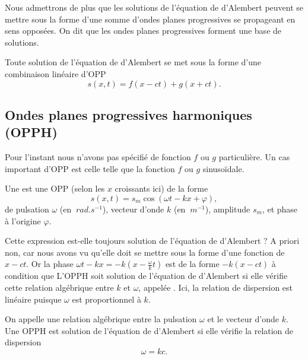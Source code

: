 \documentclass[12pt,fancy]{cours}
\begin{document}
Nous admettrons de plus que  les solutions de l'équation de d'Alembert peuvent se mettre sous la forme d’une somme d’ondes planes progressives se propageant en sens opposées. On dit que les ondes planes progressives forment une base de solutions.

\begin{prop}\label{prop:}
  Toute solution de l’équation de d’Alembert se met sous la forme d'une combinaison linéaire d'OPP
  $$
  s(x,t)=f(x-ct)+g(x+ct).
  $$
\end{prop}


\subsection{Ondes planes progressives harmoniques (OPPH)}
 Pour l'instant nous n'avons pas spécifié de fonction $f$ ou $g$ particulière. Un cas important d'OPP est celle telle que la fonction $f$ ou $g$ sinusoïdale.
\begin{definition}[OPPH]
  Une  est une OPP (selon les $x$ croissants ici)  de la forme
  \begin{equation*}
   s(x,t)=s_m\cos(\omega t-kx+\varphi),
 \end{equation*}
 de pulsation $\omega$ (en $\SI{}{rad.s^{-1}}$), vecteur d'onde $k$ (en $\SI{}{m^{-1}}$), amplitude $s_m$, et phase à l’origine $\varphi$.
\end{definition}


 Cette expression est-elle toujours solution de l'équation de d'Alembert ? A priori non, car nous avons vu qu'elle doit se mettre sous la forme d'une fonction de $x-ct$. Or la phase $\omega t-kx=-k(x-\frac{\omega}{k}t)$ est de la forme $-k(x-ct)$ à condition que
 L'OPPH soit solution de l'équation de d'Alembert si elle vérifie cette relation algébrique entre $k$ et $\omega$, appelée . Ici, la relation de dispersion est linéaire puisque $\omega$ est proportionnel à $k$.

 \begin{theorem}\label{form:}
  On appelle  une relation algébrique entre la pulsation $\omega$ et le vecteur d'onde $k$.
Une OPPH est solution de l’équation de d’Alembert si elle vérifie la relation de dispersion
$$
  \omega = k c.
$$
 \end{theorem}
\end{document}
